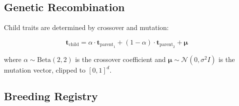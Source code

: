 \documentclass[11pt,letterpaper]{article}
\begin{document}
\subsection{Genetic Recombination}

Child traits are determined by crossover and mutation:

\begin{equation}
\mathbf{t}_{\text{child}} = \alpha \cdot \mathbf{t}_{\text{parent}_1} + (1 - \alpha) \cdot \mathbf{t}_{\text{parent}_2} + \boldsymbol{\mu}
\end{equation}

where $\alpha \sim \text{Beta}(2, 2)$ is the crossover coefficient and $\boldsymbol{\mu} \sim \mathcal{N}(0, \sigma^2 I)$ is the mutation vector, clipped to $[0, 1]^d$.

\subsection{Breeding Registry}
\end{document}
